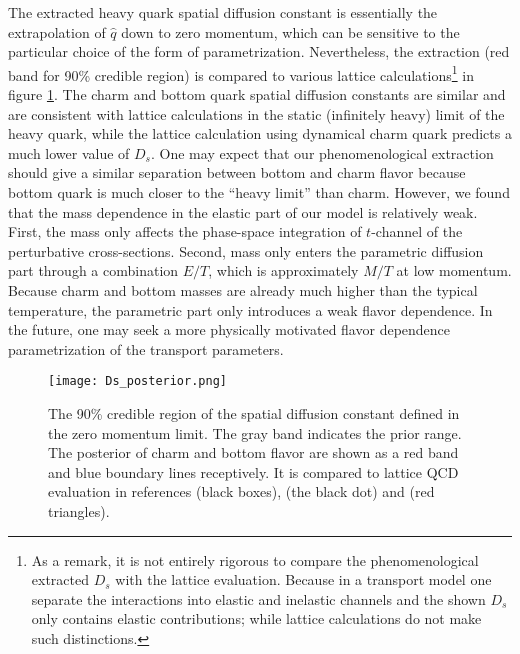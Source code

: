 The extracted heavy quark spatial diffusion constant is essentially the extrapolation of $\hat{q}$ down to zero momentum, which can be sensitive to the particular choice of the form of parametrization.
Nevertheless, the extraction (red band for 90\% credible region) is compared to various lattice calculations\footnote{\singlespacing As a remark, it is not entirely rigorous to compare the phenomenological extracted $D_s$ with the lattice evaluation. Because in a transport model one separate the interactions into elastic and inelastic channels and the shown $D_s$ only contains elastic contributions; while lattice calculations do not make such distinctions.} \cite{Banerjee:2011ra,Ding:2012sp,Francis:2015daa} in figure \ref{fig:new:posterior-Ds}.
The charm and bottom quark spatial diffusion constants are similar and are consistent with lattice calculations in the static (infinitely heavy) limit of the heavy quark, while the lattice calculation using dynamical charm quark predicts a much lower value of $D_s$.
One may expect that our phenomenological extraction should give a similar separation between bottom and charm flavor because bottom quark is much closer to the ``heavy limit'' than charm.
However, we found that the mass dependence in the elastic part of our model is relatively weak. 
First, the mass only affects the phase-space integration of $t$-channel of the perturbative cross-sections.
Second, mass only enters the parametric diffusion part through a combination $E/T$, which is approximately $M/T$ at low momentum. Because charm and bottom masses are already much higher than the typical temperature, the parametric part only introduces a weak flavor dependence.
In the future, one may seek a more physically motivated flavor dependence parametrization of the transport parameters.

\begin{figure}
\singlespacing
\centering
\texttt{[image: Ds\_posterior.png]}
\caption[The 90\% credible region of the spatial diffusion constant defined]{The 90\% credible region of the spatial diffusion constant defined in the zero momentum limit. The gray band indicates the prior range. The posterior of charm and bottom flavor are shown as a red band and blue boundary lines receptively. It is compared to lattice QCD evaluation in references \cite{Banerjee:2011ra} (black boxes), \cite{Francis:2015daa} (the black dot) and \cite{Ding:2012sp} (red triangles).}
\label{fig:new:posterior-Ds}
\end{figure}

